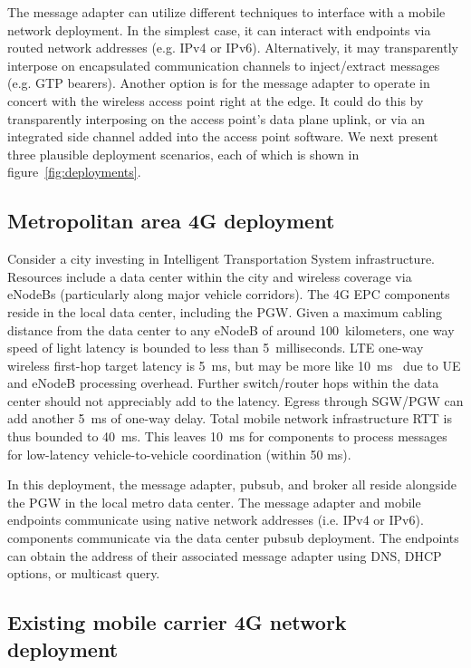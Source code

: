 The message adapter can utilize different techniques to interface with
a mobile network deployment. In the simplest case, it can interact
with endpoints via routed network addresses (e.g. IPv4 or
IPv6). Alternatively, it may transparently interpose on encapsulated
communication channels to inject/extract messages (e.g. GTP
bearers). Another option is for the message adapter to operate in
concert with the wireless access point right at the edge. It could do
this by transparently interposing on the access point's data plane
uplink, or via an integrated side channel added into the access point
software.  We next present three plausible deployment scenarios, each
of which is shown in figure~\ref{fig:deployments}.

\subsection{Metropolitan area 4G deployment}
\label{sec:metro-deploy}

Consider a city investing in Intelligent Transportation System
infrastructure. Resources include a data center within the city and
wireless coverage via eNodeBs (particularly along major vehicle
corridors). The 4G EPC components reside in the local data center,
including the PGW.  Given a maximum cabling distance from the data
center to any eNodeB of around 100~kilometers, one way speed of light
latency is bounded to less than 5~milliseconds.  LTE one-way wireless
first-hop target latency is 5~ms, but may be more like
10~ms~\cite{laner2012comparison} due to UE and eNodeB processing overhead.
Further switch/router hops within the data center should not
appreciably add to the latency. Egress through SGW/PGW can add another
5~ms of one-way delay.  Total mobile network
infrastructure RTT is thus bounded to 40~ms. This leaves 10~ms for
\name{} components to process messages for low-latency
vehicle-to-vehicle coordination (within 50 ms).

In this deployment, the \name{} message adapter, pubsub, and broker
all reside alongside the PGW in the local metro data center. The
message adapter and mobile endpoints communicate using native network
addresses (i.e. IPv4 or IPv6).  \name{} components communicate via the
data center pubsub deployment. The endpoints can obtain the address
of their associated message adapter using DNS, DHCP options, or
multicast query.

\subsection{Existing mobile carrier 4G network deployment}

